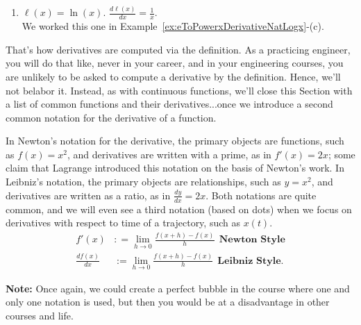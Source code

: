 \begin{enumerate}
 \item $\ell(x) = \ln(x)$. \Ans $\frac{ d\ell(x) }{d x} =\frac{1}{x}$. \\

 We worked this one in Example~\ref{ex:eToPowerxDerivativeNatLogx}-(c).


\end{enumerate} 

\Qed
\vspace*{.2cm}

That's how derivatives are computed via the definition. As a practicing engineer, you will do that like, never in your career, and in your engineering courses, you are unlikely to be asked to compute a derivative by the definition. Hence, we'll not belabor it. Instead, as with continuous functions, we'll close this Section with a list of common functions and their derivatives...once we introduce a second common notation for the derivative of a function.

\vspace*{.2cm}

\begin{tcolorbox}[colback=mylightblue, title = {\bf Notation for Differentiation}, breakable]

\begin{definition}
\label{def:NewtonVsLeibnizNotation}
In Newton's notation for the derivative, the primary objects are functions, such as  $f ( x ) = x^2$, and derivatives are written with a prime, as in $f'( x ) = 2 x$; some claim that Lagrange introduced this notation on the basis of Newton's work. In Leibniz's notation, the primary objects are relationships, such as $y = x^2$, and derivatives are written as a ratio, as in  $\frac{dy}{dx} = 2 x$. Both notations are quite common, and we will even see a third notation (based on dots) when we focus on derivatives with respect to time of a trajectory, such as $x(t)$.
 \begin{equation}
\label{eq:NewtonVsLeibnizNotation}
\begin{aligned}
     f'(x) &: = \lim_{h \to 0} \frac{f(x + h) - f(x)}{h} ~~\textbf{Newton Style}\\
     \frac{df(x)}{dx} &:= \lim_{h \to 0} \frac{f(x + h) - f(x)}{h} ~~\textbf{Leibniz Style}.
\end{aligned}   
\end{equation}

\textbf{Note:} Once again, we could create a perfect bubble in the course where one and only one notation is used, but then you would be at a disadvantage in other courses and life.
\end{definition}
\end{tcolorbox}

